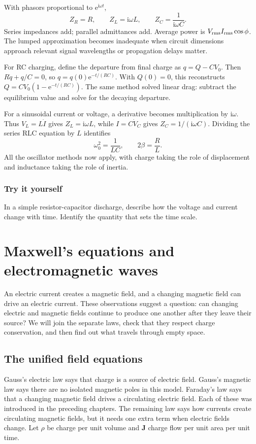 \documentclass[11pt,oneside]{book}
\newcommand{\ii}{\mathrm{i}}
\newcommand{\ee}{\mathrm{e}}
\newcommand{\vect}[1]{\boldsymbol{#1}}
\theoremstyle{reviewstyle}
\newcommand{\learningcheck}[1]{\subsection*{Try it yourself}\noindent #1\par}
\begin{document}
With phasors proportional to $\ee^{\ii\omega t}$,
\begin{equation}Z_R=R,\qquad Z_L=\ii\omega L,\qquad Z_C=\frac1{\ii\omega C}.\end{equation}
Series impedances add; parallel admittances add. Average power is $V_{\rm rms}I_{\rm rms}\cos\phi$. The lumped approximation becomes inadequate when circuit dimensions approach relevant signal wavelengths or propagation delays matter.

For RC charging, define the departure from final charge as $q=Q-CV_0$. Then $R\dot q+q/C=0$, so $q=q(0)\ee^{-t/(RC)}$. With $Q(0)=0$, this reconstructs $Q=CV_0(1-\ee^{-t/(RC)})$. The same method solved linear drag: subtract the equilibrium value and solve for the decaying departure.

For a sinusoidal current or voltage, a derivative becomes multiplication by $\ii\omega$. Thus $V_L=L\dot I$ gives $Z_L=\ii\omega L$, while $I=C\dot V_C$ gives $Z_C=1/(\ii\omega C)$. Dividing the series RLC equation by $L$ identifies
\begin{equation}
\omega_0^2=\frac1{LC},\qquad 2\beta=\frac RL.
\end{equation}
All the oscillator methods now apply, with charge taking the role of displacement and inductance taking the role of inertia.

\learningcheck{In a simple resistor-capacitor discharge, describe how the voltage and current change with time. Identify the quantity that sets the time scale.}

\chapter{Maxwell's equations and electromagnetic waves}
An electric current creates a magnetic field, and a changing magnetic field can drive an electric current. These observations suggest a question: can changing electric and magnetic fields continue to produce one another after they leave their source? We will join the separate laws, check that they respect charge conservation, and then find out what travels through empty space.

\section{The unified field equations}
Gauss's electric law says that charge is a source of electric field. Gauss's magnetic law says there are no isolated magnetic poles in this model. Faraday's law says that a changing magnetic field drives a circulating electric field. Each of these was introduced in the preceding chapters. The remaining law says how currents create circulating magnetic fields, but it needs one extra term when electric fields change. Let $\rho$ be charge per unit volume and $\vect J$ charge flow per unit area per unit time.
\end{document}
